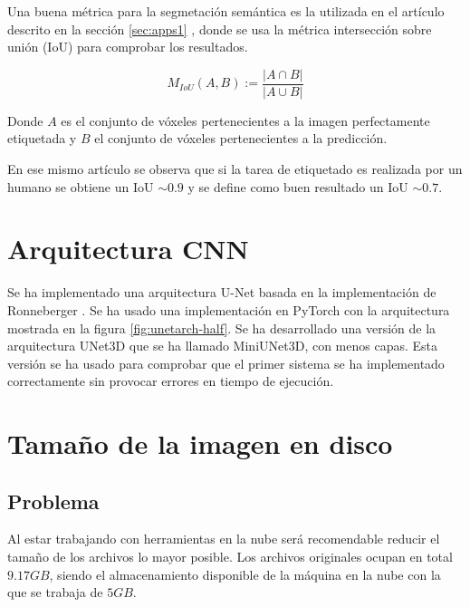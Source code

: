 Una buena métrica para la segmetación semántica es la utilizada en el artículo descrito en la sección \ref{sec:apps1} \cite{Falk2019}, donde se usa la métrica intersección sobre unión (IoU) para comprobar los resultados.

\begin{equation}
M_{IoU}(A, B) := \frac{|A\cap B|}{|A\cup B|}
\end{equation}

Donde $A$ es el conjunto de vóxeles pertenecientes a la imagen perfectamente etiquetada y $B$ el conjunto de vóxeles pertenecientes a la predicción.

En ese mismo artículo se observa que si la tarea de etiquetado es realizada por un humano se obtiene un IoU $\sim0.9$ y se define como buen resultado un IoU $\sim0.7$.


\pagebreak \section{Arquitectura CNN}\label{sec:choose_cnn_arch}

Se ha implementado una arquitectura U-Net basada en la implementación de Ronneberger \cite{Ronneberger2015}. Se ha usado una implementación en PyTorch \cite{shiba242017} con la arquitectura mostrada en la figura \ref{fig:unetarch-half}. Se ha desarrollado una versión de la arquitectura UNet3D que se ha llamado MiniUNet3D, con menos capas. Esta versión se ha usado para comprobar que el primer sistema se ha implementado correctamente sin provocar errores en tiempo de ejecución.


\section{Tamaño de la imagen en disco}\label{sec:disk_problem}
\subsection{Problema}\label{sec:disk_problem_problem}
Al estar trabajando con herramientas en la nube será recomendable reducir el tamaño de los archivos lo mayor posible. Los archivos originales ocupan en total $9.17GB$, siendo el almacenamiento disponible de la máquina en la nube con la que se trabaja de $5GB$.

